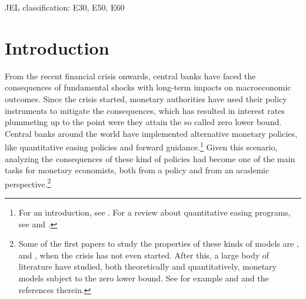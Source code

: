 \documentclass[12pt]{article}
\numberwithin{equation}{section}
\begin{document}
JEL classification: E30, E50, E60
	
\section{Introduction}\label{sec:introduction}

From the recent financial crisis onwards, central banks have faced the consequences of fundamental shocks with long-term impacts on macroeconomic outcomes. Since the crisis started, monetary authorities have used their policy instruments to mitigate the consequences, which has resulted in interest rates plummeting up to the point were they attain the so called zero lower bound. Central banks around the world have implemented alternative monetary policies, like quantitative easing policies and forward guidance.\footnote{For an introduction, see \cite{BorioEtAl2016}. For a review about quantitative easing programs, see \cite{ChenEtAl2012} and \cite{JoyceEtAl2012}.} Given this scenario, analyzing the consequences of these kind of policies had become one of the main tasks for monetary economists, both from a policy and from an academic perspective.\footnote{Some of the first papers to study the properties of these kinds of models are \cite{BenhabibEtAl2001,BenhabibEtAl2001a,BenhabibEtAl2002}, \cite{EggertssonEtAl2003} and \cite{AdamEtAl2007}, when the crisis has not even started. After this, a large body of literature have studied, both theoretically and quantitatively, monetary models subject to the zero lower bound. See for example \cite{Fernandez-VillaverdeEtAl2015} and \cite{AruobaEtAl2016} and the references therein.}
\end{document}
